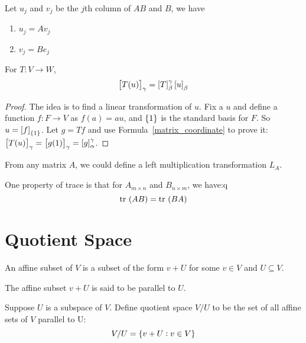 Let $u_j$ and $v_j$ be the $j$th column of $AB$ and $B$, we have
\begin{enumerate}
    \item $u_j = A v_j$
    \item $v_j = B e_j$
\end{enumerate}

\begin{theorem}
    For $T: V \rightarrow W$,
    \begin{equation}
        \coordinate{T(u)}_\gamma = \coordinate{T}_{\beta}^{\gamma} \coordinate{u}_{\beta}
    \end{equation}    
\end{theorem}
\begin{proof}
    The idea is to find a linear transformation of $u$. Fix a $u$ and define a function $f: F \rightarrow V$ as $f(a) = au$, and $\set{1}$ is the standard basis for $F$. So $u = \coordinate{f}_{\set{1}}$. Let $g=Tf$ and use Formula~\ref{matrix_coordinate} to prove it: $\coordinate{T(u)}_\gamma = \coordinate{g(1)}_\gamma = \coordinate{g}_{\alpha}^{\gamma}$.
\end{proof}

From any matrix $A$, we could define a left multiplication transformation $L_A$.

One property of trace is that for $A_{m \times n}$ and $B_{n \times m}$, we have:q
\begin{equation}
    \displaystyle \mathrm{tr}~( AB ) = \displaystyle \mathrm{tr}~( BA )
\end{equation}



%
%
%
%
\section{Quotient Space}

\begin{definition}
    An affine subset of $V$ is a subset of the form $v + U$ for some $v\in V$ and $U \subseteq V$.
    
    The affine subset $v+U$ is said to be parallel to $U$.
\end{definition}

\begin{definition}
    Suppose $U$ is a subspace of $V$. Define quotient space $V/U$ to be the set of all affine sets of $V$ parallel to U:
    \begin{equation}
        V/U = \set{v + U: v \in V}
    \end{equation}
\end{definition}


